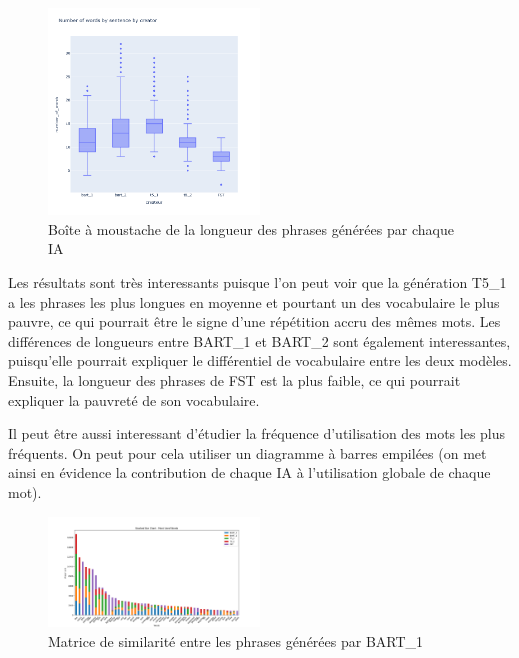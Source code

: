 \documentclass[conference]{IEEEtran}
\begin{document}
\begin{figure}[H]
  \centering
  \includegraphics[width=0.5\textwidth]{images/boxplot_sentences.png}
  \caption{Boîte à moustache de la longueur des phrases générées par chaque IA}
  \end{figure}

\vspace{5mm}

Les résultats sont très interessants puisque l'on peut voir que la génération T5\_1 a les phrases les plus longues en moyenne et pourtant un des vocabulaire le plus pauvre, ce qui pourrait être le signe d'une répétition accru des mêmes mots. 
Les différences de longueurs entre BART\_1 et BART\_2 sont également interessantes, puisqu'elle pourrait expliquer le différentiel de vocabulaire entre les deux modèles.
Ensuite, la longueur des phrases de FST est la plus faible, ce qui pourrait expliquer la pauvreté de son vocabulaire.

Il peut être aussi interessant d'étudier la fréquence d'utilisation des mots les plus fréquents. On peut pour cela utiliser un diagramme à barres empilées (on met ainsi en évidence la contribution de chaque IA à l'utilisation globale de chaque mot).

\vspace{5mm}

\begin{figure}[H]
\centering
\includegraphics[width=0.5\textwidth]{images/stacked_bars_most_used_words.png}
\caption{Matrice de similarité entre les phrases générées par BART\_1}
\end{figure}
\end{document}
